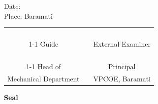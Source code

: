 \documentclass[12pt,a4paper]{article}
\numberwithin{figure}{section}
\numberwithin{table}{section}
\begin{document}
\vspace{0.06in}Date:\\
{Place: Baramati}\\
\vspace{0.4in}   
\begin{tabular}{ccc}
 &   &  \\
  &   &  \\
 &   &  \\
 
 &   &  \\
\cline{1-1} 
\cline{3-3}
Guide &  \hspace{2.4in} & External Examiner  \\
  &   &  \\ 
 
\\
 &   &  \\
 
 &   &  \\
 
 \cline{1-1} 
\cline{3-3}
 Head of &  \hspace{2in} &  Principal\\
 Mechanical  Department &   & VPCOE, Baramati \\ 
\end{tabular}	
\vspace{0.2in}
\begin{center} \textbf{Seal}
\end{center}




\newpage
\pagestyle{plain}
\end{document}
